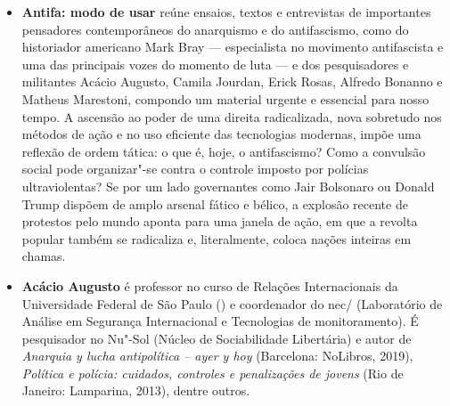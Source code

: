 \begin{itemize}
\item \textbf{Antifa: modo de usar} reúne ensaios, textos e entrevistas de importantes pensadores contemporâneos do anarquismo e do antifascismo, como do historiador americano Mark Bray --- especialista no movimento antifascista e uma das principais vozes do momento de luta --- e dos pesquisadores e militantes Acácio Augusto, Camila Jourdan, Erick Rosas, Alfredo Bonanno e Matheus Marestoni, compondo um material urgente e essencial para nosso tempo.
A ascensão ao poder de uma direita radicalizada, nova sobretudo nos métodos de ação e no uso eficiente das tecnologias modernas, impõe uma reflexão de ordem tática: o que é, hoje, o antifascismo? Como a convulsão social pode organizar"-se contra o controle imposto por polícias ultraviolentas?
Se por um lado governantes como Jair Bolsonaro ou Donald Trump dispõem de amplo arsenal fático e bélico, a explosão recente de protestos pelo mundo aponta para uma janela de ação, em que a revolta popular também se radicaliza e, literalmente, coloca nações inteiras em chamas.


\item \textbf{Acácio Augusto} é professor no curso de Relações Internacionais da
  Universidade Federal de São Paulo () e coordenador do
  nec/ (Laboratório de Análise em Segurança Internacional e
  Tecnologias de monitoramento). É pesquisador no Nu"-Sol
  (Núcleo de Sociabilidade Libertária) e autor de
  \emph{Anarquia y lucha antipolítica -- ayer y hoy} (Barcelona:
    NoLibros, 2019), \emph{Política e polícia: cuidados, controles e
  penalizações de jovens} (Rio de Janeiro: Lamparina, 2013), dentre
  outros.

\end{itemize}


